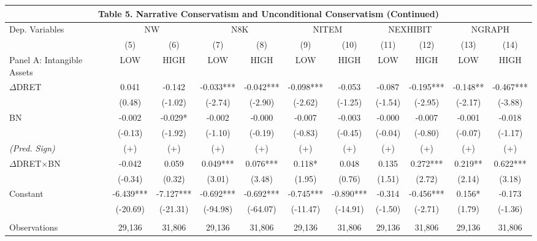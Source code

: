 \begin{table}[H]
	\begin{center}
		\tabcolsep=0.11cm
		\begin{tabular}{lcccccccccc}
			\multicolumn{11}{c}{\textbf{Table 5. Narrative Conservatism and Unconditional Conservatism (Continued)}} \\
			\toprule
			\toprule
			Dep. Variables & \multicolumn{2}{c}{NW} & \multicolumn{2}{c}{N8K} & \multicolumn{2}{c}{NITEM} & \multicolumn{2}{c}{NEXHIBIT} & \multicolumn{2}{c}{NGRAPH} \\
			\cmidrule{2-11}
			& (5) & (6) & (7) & (8) & (9) & (10) & (11) & (12) & (13) & (14) \\
			\midrule
			Panel A: Intangible Assets & LOW & HIGH & LOW & HIGH & LOW & HIGH & LOW & HIGH & LOW & HIGH \\
			\midrule
			$\Delta$DRET & 0.041 & -0.142 & -0.033*** & -0.042*** & -0.098*** & -0.053 & -0.087 & -0.195*** & -0.148** & -0.467*** \\
			& (0.48) & (-1.02) & (-2.74) & (-2.90) & (-2.62) & (-1.25) & (-1.54) & (-2.95) & (-2.17) & (-3.88) \\
			BN & -0.002 & -0.029* & -0.002 & -0.000 & -0.007 & -0.003 & -0.000 & -0.007 & -0.001 & -0.018 \\
			& (-0.13) & (-1.92) & (-1.10) & (-0.19) & (-0.83) & (-0.45) & (-0.04) & (-0.80) & (-0.07) & (-1.17) \\
			\rowcolor[rgb]{ .906,  .902,  .902} \textit{(Pred. Sign)} & (+) & (+) & (+) & (+) & (+) & (+) & (+) & (+) & (+) & (+) \\
			\rowcolor[rgb]{ .906,  .902,  .902} $\Delta$DRET$\times$BN & -0.042 & 0.059 & 0.049*** & 0.076*** & 0.118* & 0.048 & 0.135 & 0.272*** & 0.219** & 0.622*** \\
			\rowcolor[rgb]{ .906,  .902,  .902} & (-0.34) & (0.32) & (3.01) & (3.48) & (1.95) & (0.76) & (1.51) & (2.72) & (2.14) & (3.18) \\
			Constant & -6.439*** & -7.127*** & -0.692*** & -0.692*** & -0.745*** & -0.890*** & -0.314 & -0.456*** & 0.156* & -0.173 \\
			& (-20.69) & (-21.31) & (-94.98) & (-64.07) & (-11.47) & (-14.91) & (-1.50) & (-2.71) & (1.79) & (-1.36) \\
			&   &   &   &   &   &   &   &   &   &  \\
			Observations & 29,136 & 31,806 & 29,136 & 31,806 & 29,136 & 31,806 & 29,136 & 31,806 & 29,136 & 31,806 \\

\end{tabular}
\end{center}
\end{table}
